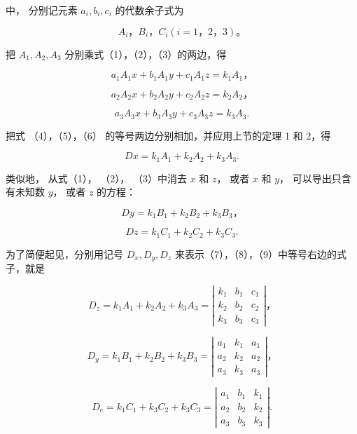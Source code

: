 中， 分别记元素 \(a_{i}, b_{i}, c_{i}\) 的代数余子式为

\[
A _ {i}\text{，} B _ {i}\text{，} C _ {i} (i = 1\text{，} 2\text{，} 3)\text{。}
\]

把 \(A_{1}, A_{2}, A_{3}\) 分别乘式（1），（2），（3）的两边，得

\[
a _ {1} A _ {1} x + b _ {1} A _ {1} y + c _ {1} A _ {1} z = k _ {1} A _ {1}\text{，} \tag {4}
\]

\[
a _ {2} A _ {2} x + b _ {2} A _ {2} y + c _ {2} A _ {2} z = k _ {2} A _ {2}\text{，} \tag {5}
\]

\[
a _ {3} A _ {3} x + b _ {3} A _ {3} y + c _ {3} A _ {3} z = k _ {3} A _ {3}. \tag {6}
\]

把式 （4），（5），（6） 的等号两边分别相加，并应用上节的定理 1 和 2，得

\[
D x = k _ {1} A _ {1} + k _ {2} A _ {2} + k _ {3} A _ {3}. \tag {7}
\]

类似地， 从式（1）， （2）， （3）中消去 \(x\) 和 \(z\)， 或者 \(x\) 和
\(y\)， 可以导出只含有未知数 \(y\)， 或者 \(z\) 的方程：

\[
D y = k _ {1} B _ {1} + k _ {2} B _ {2} + k _ {3} B _ {3}\text{，} \tag {8}
\]

\[
D z = k _ {1} C _ {1} + k _ {2} C _ {2} + k _ {3} C _ {3}. \tag {9}
\]

为了简便起见，分别用记号 \(D_{x}, D_{y}, D_{z}\)
来表示（7），（8），（9）中等号右边的式子，就是

\[
D _ {z} = k _ {1} A _ {1} + k _ {2} A _ {2} + k _ {3} A _ {3} = \left| \begin{array}{ccc} k _ {1} & b _ {1} & c _ {1} \\ k _ {2} & b _ {2} & c _ {2} \\ k _ {3} & b _ {3} & c _ {3} \end{array} \right|\text{，}
\]

\[
D _ {y} = k _ {1} B _ {1} + k _ {2} B _ {2} + k _ {3} B _ {3} = \left| \begin{array}{ccc} a _ {1} & k _ {1} & a _ {1} \\ a _ {2} & k _ {2} & a _ {2} \\ a _ {3} & k _ {3} & a _ {3} \end{array} \right|\text{，}
\]

\[
D _ {e} = k _ {1} C _ {1} + k _ {3} C _ {2} + k _ {3} C _ {3} = \left| \begin{array}{lll} a _ {1} & b _ {1} & k _ {1} \\ a _ {2} & b _ {2} & k _ {2} \\ a _ {3} & b _ {3} & k _ {3} \end{array} \right|.
\]

